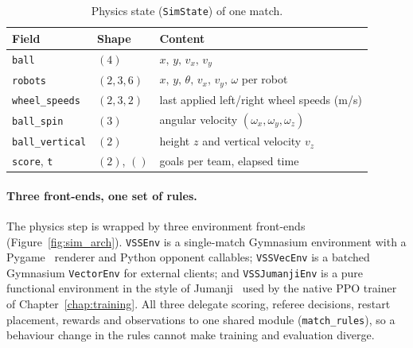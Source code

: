 \begin{table}[ht]
    \centering
    \caption{Physics state (\texttt{SimState}) of one match.}
    \label{tab:sim_state}
    \small
    \begin{tabular}{lll}
        \toprule
        \textbf{Field} & \textbf{Shape} & \textbf{Content} \\
        \midrule
        \texttt{ball}          & $(4)$     & $x,\,y,\,v_x,\,v_y$ \\
        \texttt{robots}        & $(2,3,6)$ & $x,\,y,\,\theta,\,v_x,\,v_y,\,\omega$ per robot \\
        \texttt{wheel\_speeds} & $(2,3,2)$ & last applied left/right wheel speeds (m/s) \\
        \texttt{ball\_spin}    & $(3)$     & angular velocity $(\omega_x,\omega_y,\omega_z)$ \\
        \texttt{ball\_vertical}& $(2)$     & height $z$ and vertical velocity $v_z$ \\
        \texttt{score}, \texttt{t} & $(2)$, $()$ & goals per team, elapsed time \\
        \bottomrule
    \end{tabular}
\end{table}

\paragraph{Three front-ends, one set of rules.}
The physics step is wrapped by three environment front-ends
(Figure~\ref{fig:sim_arch}).  \texttt{VSSEnv} is a single-match Gymnasium
environment with a Pygame~\cite{pygame2024} renderer and Python opponent callables;
\texttt{VSSVecEnv} is a batched Gymnasium \texttt{VectorEnv} for external
clients; and \texttt{VSSJumanjiEnv} is a pure functional environment in the
style of Jumanji~\cite{bonnet2023jumanji} used by the native PPO trainer of
Chapter~\ref{chap:training}.  All three delegate scoring, referee decisions,
restart placement, rewards and observations to one shared module
(\texttt{match\_rules}), so a behaviour change in the rules cannot make training
and evaluation diverge.

